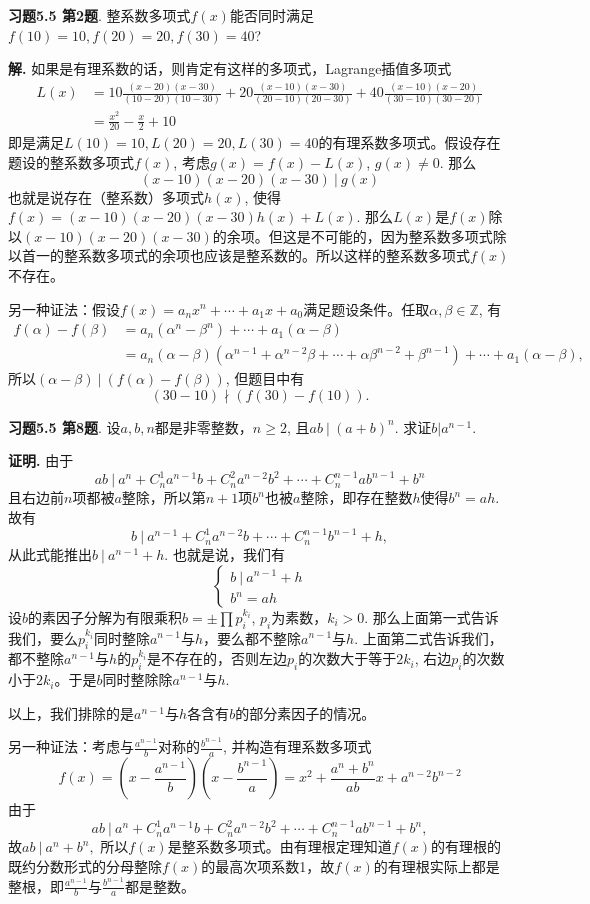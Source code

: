 {\bf 习题5.5 第2题}. 整系数多项式$f(x)$能否同时满足$f(10)=10, f(20)=20, f(30)=40$?

{\bf 解.} 如果是有理系数的话，则肯定有这样的多项式，Lagrange插值多项式
\begin{align*}
L(x) & = 10\frac{(x-20)(x-30)}{(10-20)(10-30)} + 20\frac{(x-10)(x-30)}{(20-10)(20-30)} + 40\frac{(x-10)(x-20)}{(30-10)(30-20)} \\
& = \frac{x^2}{20} - \frac{x}{2} + 10
\end{align*}
即是满足$L(10)=10, L(20)=20, L(30)=40$的有理系数多项式。假设存在题设的整系数多项式$f(x)$, 考虑$g(x) = f(x) - L(x)$, $g(x) \neq 0$. 那么
$$(x-10)(x-20)(x-30) \ |\ g(x)$$
也就是说存在（整系数）多项式$h(x)$, 使得$f(x) = (x-10)(x-20)(x-30)h(x) + L(x)$. 那么$L(x)$是$f(x)$除以$(x-10)(x-20)(x-30)$的余项。但这是不可能的，因为整系数多项式除以首一的整系数多项式的余项也应该是整系数的。所以这样的整系数多项式$f(x)$不存在。

另一种证法：假设$f(x) = a_nx^n + \cdots + a_1x + a_0$满足题设条件。任取$\alpha,\beta\in\mathbb{Z}$, 有
\begin{align*}
f(\alpha) - f(\beta) & = a_n(\alpha^n-\beta^n) + \cdots + a_1(\alpha-\beta) \\
& = a_n(\alpha-\beta)(\alpha^{n-1}+\alpha^{n-2}\beta+\cdots+\alpha\beta^{n-2}+\beta^{n-1}) + \cdots + a_1(\alpha-\beta),
\end{align*}
所以$(\alpha-\beta) \ |\ (f(\alpha) - f(\beta))$, 但题目中有
$$(30-10) \nmid (f(30)-f(10)).$$


\newpageorvspace


{\bf 习题5.5 第8题}. 设$a,b,n$都是非零整数，$n\geqslant 2$, 且$ab\ |\ (a+b)^n$. 求证$b|a^{n-1}$.

{\bf 证明.} 由于
$$ab\ |\ a^n + C_n^1a^{n-1}b + C_n^2a^{n-2}b^2 + \cdots + C_n^{n-1}ab^{n-1} + b^n$$
且右边前$n$项都被$a$整除，所以第$n+1$项$b^n$也被$a$整除，即存在整数$h$使得$b^n = ah$. 故有
$$b\ |\ a^{n-1} + C_n^1a^{n-2}b + \cdots + C_n^{n-1}b^{n-1} + h,$$
从此式能推出$b\ |\ a^{n-1} + h$. 也就是说，我们有
$$
\begin{cases}
b\ |\ a^{n-1} + h \\
b^n = ah
\end{cases}
$$
设$b$的素因子分解为有限乘积$b = \pm \prod p_i^{k_i}$, $p_i$为素数，$k_i>0$. 那么上面第一式告诉我们，要么$p_i^{k_i}$同时整除$a^{n-1}$与$h$，要么都不整除$a^{n-1}$与$h$. 上面第二式告诉我们，都不整除$a^{n-1}$与$h$的$p_i^{k_i}$是不存在的，否则左边$p_i$的次数大于等于$2k_i$, 右边$p_i$的次数小于$2k_i$。于是$b$同时整除除$a^{n-1}$与$h$.

以上，我们排除的是$a^{n-1}$与$h$各含有$b$的部分素因子的情况。

另一种证法：考虑与$\frac{a^{n-1}}{b}$对称的$\frac{b^{n-1}}{a}$, 并构造有理系数多项式
$$f(x) = \left(x-\frac{a^{n-1}}{b}\right) \left(x-\frac{b^{n-1}}{a}\right) = x^2 + \frac{a^n+b^n}{ab} x + a^{n-2}b^{n-2}$$
由于
$$ab\ |\ a^n + C_n^1a^{n-1}b + C_n^2a^{n-2}b^2 + \cdots + C_n^{n-1}ab^{n-1} + b^n,$$
故$ab\ |\ a^n + b^n,$ 所以$f(x)$是整系数多项式。由有理根定理知道$f(x)$的有理根的既约分数形式的分母整除$f(x)$的最高次项系数1，故$f(x)$的有理根实际上都是整根，即$\frac{a^{n-1}}{b}$与$\frac{b^{n-1}}{a}$都是整数。



